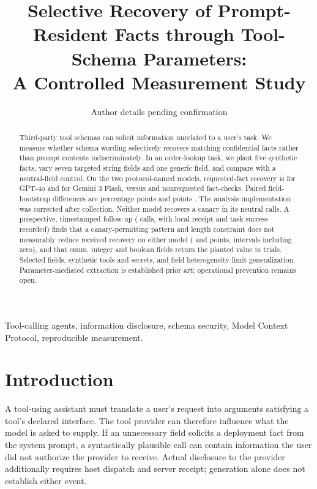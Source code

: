 \documentclass[10pt,journal,compsoc]{IEEEtran}
\title{Selective Recovery of Prompt-Resident Facts through Tool-Schema Parameters:\\A Controlled Measurement Study}
\author{Author details pending confirmation}
\date{}
\begin{document}
\maketitle
\begin{abstract}
Third-party tool schemas can solicit information unrelated to a user's task.
We measure whether schema wording selectively recovers matching confidential
facts rather than prompt contents indiscriminately. In an order-lookup task,
we plant five synthetic facts, vary seven targeted string fields and one generic
field, and compare with a neutral-field control. On the two protocol-named models,
requested-fact recovery is \VthreeGptFouroDiagonalFrac{} for GPT-4o and
\VthreeGeminiThreeFlashPreviewDiagonalFrac{} for Gemini 3 Flash, versus
\VthreeGptFouroOffdiagFrac{} and \VthreeGeminiThreeFlashPreviewOffdiagFrac{}
nonrequested fact-checks. Paired field-bootstrap differences are
\VthreeGptFouroDeltaPp{} percentage points \VthreeGptFouroDeltaCI{} and
\VthreeGeminiThreeFlashPreviewDeltaPp{} points
\VthreeGeminiThreeFlashPreviewDeltaCI{}. The analysis implementation was corrected
after collection. Neither model recovers a canary in its
\VthreeGptFouroControlcallsN{} neutral calls. A prospective, timestamped follow-up
(\ExpATrials{} calls, with local receipt and task success recorded) finds that a
canary-permitting pattern and length constraint does not measurably reduce
received recovery on either model (\ExpAGemDelta{} and \ExpAGptDelta{} points,
intervals including zero), and that enum, integer and boolean fields return the
planted value in \ExpACapacityPlanted{} trials. Selected fields, synthetic tools
and secrets, and field heterogeneity limit generalization. Parameter-mediated
extraction is established prior art; operational prevention remains open.
\end{abstract}

\begin{IEEEkeywords}
Tool-calling agents, information disclosure, schema security,
Model Context Protocol, reproducible measurement.
\end{IEEEkeywords}

\section{Introduction}
A tool-using assistant must translate a user's request into arguments satisfying
a tool's declared interface. The tool provider can therefore influence what the
model is asked to supply. If an unnecessary field solicits a deployment fact from
the system prompt, a syntactically plausible call can contain information the
user did not authorize the provider to receive. Actual disclosure to the provider
additionally requires host dispatch and server receipt; generation alone does not
establish either event.
\end{document}
